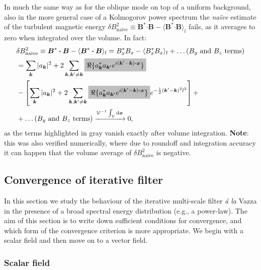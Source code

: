 \documentclass[]{article}
\newcommand{\mathcolorbox}[2]{\colorbox{#1}{$\displaystyle #2$}}
\newcommand{\bcdot}{\bm{\cdot}}
\begin{document}
In much the same way as for the oblique mode on top of a uniform background, also in the more general case of a Kolmogorov power spectrum the \textit{na\"{i}ve} estimate of the turbulent magnetic energy $\delta B^2_{\text{naive}} \equiv \bm B^* \bcdot\bm B - \langle \bm B^* \bcdot\bm B \rangle_l  $ fails, as it averages to zero when integrated over the volume. In fact:
%
\begin{align}
	&\delta B^2_{\text{naive}} \equiv \bm B^* \bcdot\bm B - \langle \bm B^* \bcdot\bm B \rangle_l =  B_x^*  B_x - \langle B_x^*  B_x \rangle_l + \ldots \text{($B_y$ and $B_z$ terms)} \nonumber \\
	& = \sum_{\bm k} |a_{\bm k}|^2  + 2 \sum_{\bm k, \bm k' \neq \bm k} \mathcolorbox{lgray}{\Re \lbrace a_{\bm k}^* a_{\bm k'} e^{i (\bm k' - \bm k) \bcdot\bm x } \rbrace} \nonumber \\
	& - \left[ \sum_{\bm k} |a_{\bm k}|^2  + 2 \sum_{\bm k, \bm k' \neq \bm k} \mathcolorbox{lgray}{\Re \lbrace a_{\bm k}^* a_{\bm k'} e^{i (\bm k' - \bm k) \bcdot\bm x } \rbrace} e^{-\frac{1}{2} (\bm k' - \bm k)^2 l^2} \right] + \nonumber \\
	& + \ldots \text{($B_y$ and $B_z$ terms)} \xrightarrow{\mathcal{V}^{-1}\int_\mathcal{V} \mathrm{d} \bm x}  0,
\end{align}
%
as the terms highlighted in gray vanish exactly after volume integration. \textbf{Note}: this was also verified numerically, where due to roundoff and integration accuracy it can happen that the volume average of $\delta B^2_{\text{naive}}$ is negative.


\subsection{Convergence of iterative filter}

In this section we study the behaviour of the iterative multi-scale filter \textit{\'{a} la} Vazza in the presence of a broad spectral energy distribution (e.g., a power-law). The aim of this section is to write down sufficient conditions for convergence, and which form of the convergence criterion is more appropriate. We begin with a scalar field and then move on to a vector field.

\subsubsection{Scalar field}
\end{document}
